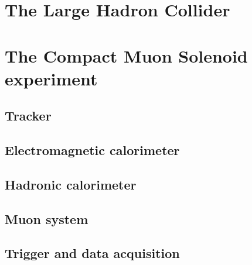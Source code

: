 \label{sec:CMS}
\minitoc
\section{The Large Hadron Collider}
\section{The Compact Muon Solenoid experiment}
\subsection{Tracker}
\subsection{Electromagnetic calorimeter}
\subsection{Hadronic calorimeter}
\subsection{Muon system}
\subsection{Trigger and data acquisition}
